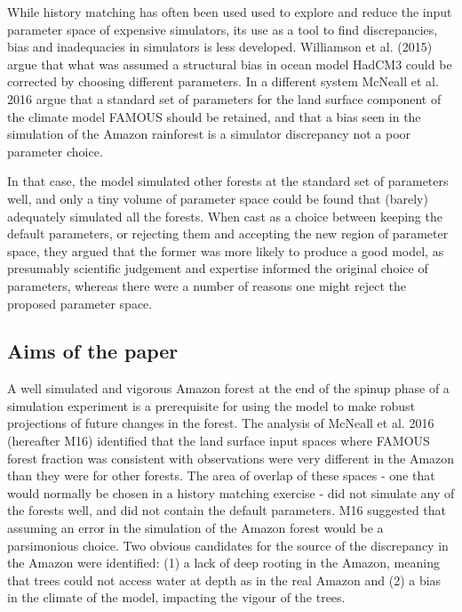 \documentclass[gmd, manuscript]{copernicus}
\begin{document}
While history matching has often been used used to explore and reduce the input parameter space of expensive simulators, its use as a tool to find discrepancies, bias and inadequacies in simulators is less developed. Williamson et al. (2015) argue that what was assumed a structural bias in ocean model HadCM3 could be corrected by choosing different parameters. In a different system McNeall et al. 2016 argue that a standard set of parameters for the land surface component of the climate model FAMOUS should be retained, and that a bias seen in the simulation of the Amazon rainforest is a simulator discrepancy not a poor parameter choice.

In that case, the model simulated other forests at the standard set of parameters well, and only a tiny volume of parameter space could be found that (barely) adequately simulated all the forests. When cast as a choice between keeping the default parameters, or rejecting them and accepting the new region of parameter space, they argued that the former was more likely to produce a good model, as presumably scientific judgement and expertise informed the original choice of parameters, whereas there were a number of reasons one might reject the proposed parameter space. 

\subsection{Aims of the paper}

A well simulated and vigorous Amazon forest at the end of the spinup phase of a simulation experiment is a prerequisite for using the model to make robust projections of future changes in the forest. The analysis of McNeall et al. 2016 (hereafter M16) identified that the land surface input spaces where FAMOUS forest fraction was consistent with observations were very different in the Amazon than they were for other forests. The area of overlap of these spaces - one that would normally be chosen in a history matching exercise - did not simulate any of the forests well, and did not contain the default parameters. M16 suggested that assuming an error in the simulation of the Amazon forest would be a parsimonious choice. Two obvious candidates for the source of the discrepancy in the Amazon were identified: (1) a lack of deep rooting in the Amazon, meaning that trees could not access water at depth as in the real Amazon and (2) a bias in the climate of the model, impacting the vigour of the trees.
\end{document}
